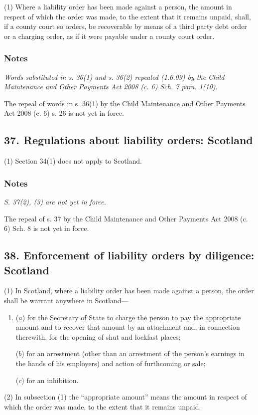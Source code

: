 \documentclass[a4paper]{article}
\newcommand\amendment[1]{\subsubsection*{Notes}{\itshape\frenchspacing\footnotesize #1 \par}}
\begin{document}
(1) Where a liability order has been made against a person, the amount in respect of which the order was made, to the extent that it remains unpaid, shall, if a county court so orders, be recoverable by means of a third party debt order or a charging order, as if it were payable under a county court order.

\amendment{
Words substituted in s. 36(1) and s. 36(2) repealed (1.6.09) by the Child Maintenance and Other Payments Act 2008 (c. 6) Sch. 7 para. 1(10).

The repeal of words in s. 36(1) by the Child Maintenance and Other Payments Act 2008 (c. 6) s. 26 is not yet in force.
}

\subsection{37. Regulations about liability orders: Scotland}

(1) Section 34(1) does not apply to Scotland.

\amendment{
S. 37(2), (3) are not yet in force.

The repeal of s. 37 by the Child Maintenance and Other Payments Act 2008 (c. 6) Sch. 8 is not yet in force.
}

\subsection{38. Enforcement of liability orders by diligence: Scotland}

(1) In Scotland, where a liability order has been made against a person, the order shall be warrant anywhere in Scotland---
\begin{enumerate}\item[]
($a$) for the Secretary of State to charge the person to pay the appropriate amount and to recover that amount by an attachment and, in connection therewith, for the opening of shut and lockfast places;

($b$) for an arrestment (other than an arrestment of the person’s earnings in the hands of his employers) and action of furthcoming or sale;

($c$) for an inhibition.
\end{enumerate}

(2) In subsection (1) the “appropriate amount” means the amount in respect of which the order was made, to the extent that it remains unpaid.
\end{document}
